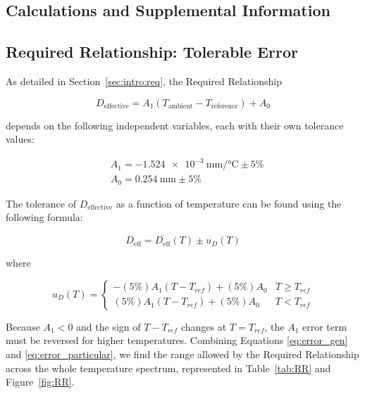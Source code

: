 \documentclass[12pt, letterpaper]{report}%
\newcommand{\requiredRelationship}{D_{\text{effective}} = A_1 (T_{\text{ambient}} - T_{\text{reference}}) + A_0}
\newcommand{\AoneExact}{\SI{-1.524e-3}{\milli\meter\per\celsius}}
\newcommand{\Aone}{\AoneExact \pm 5\%}
\newcommand{\AzeroExact}{\SI{0.254}{\milli\meter}}
\newcommand{\Azero}{\AzeroExact \pm 5\%}
\begin{document}
\newpage
\begin{appendices}
\appendix

\chapter{Calculations and Supplemental Information}
\label{app:calcs}

	\section{Required Relationship: Tolerable Error}
	\label{app:calcs:errorProp}

		As detailed in Section~\ref{sec:intro:req}, the Required Relationship

			$$ \requiredRelationship $$

		depends on the following independent variables, each with their own tolerance values:

			\begin{align*}
				&A_1 = \Aone
				\\
				&A_0 = \Azero
			\end{align*}

		The tolerance of $D_{\text{effective}}$ as a function of temperature can be found using the following formula:

			\begin{equation}
				D_{\text{eff}} = \overline{D_{\text{eff}}}(T) \pm u_D(T)
				\label{eq:error_gen}
			\end{equation}

		where

			\begin{equation}
				u_D(T) =
				\begin{cases}
					- (5 \%) A_1 (T - T_{ref}) + (5 \%) A_0 & T \geq T_{ref} \\
					 (5 \%) A_1 (T - T_{ref}) + (5 \%) A_0 & T < T_{ref}
				\end{cases}
				\label{eq:error_particular}
			\end{equation}

		Because $A_1 < 0$ and the sign of $T - T_{ref}$ changes at $T = T_{ref}$, the $A_1$ error term must be reversed for higher temperatures.
		Combining Equations \eqref{eq:error_gen} and \eqref{eq:error_particular}, we find the range allowed by the Required Relationship across the whole temperature spectrum, represented in Table~\ref{tab:RR} and Figure~\ref{fig:RR}.


\end{appendices}
\end{document}
